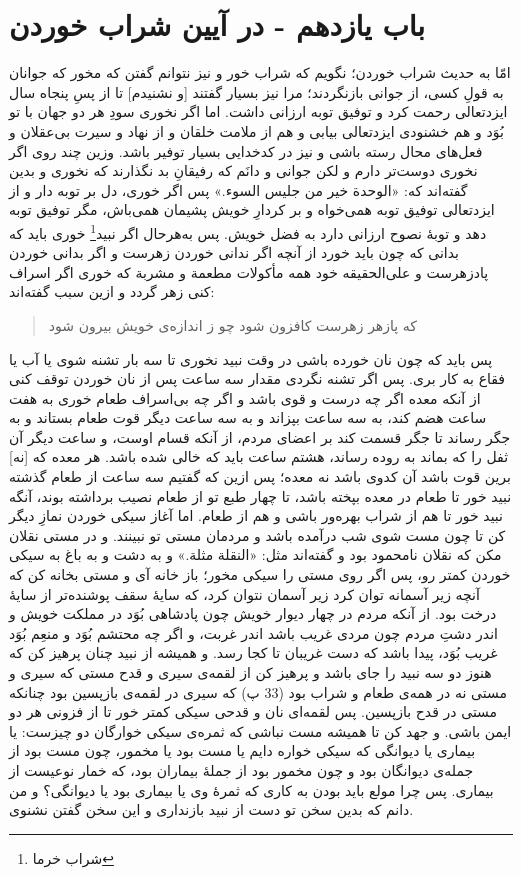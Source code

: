 \section*{باب یازدهم - در آیین شراب خوردن}


امّا به حديث شراب خوردن؛ نگويم كه شراب خور و نيز نتوانم گفتن كه مخور كه جوانان به قولِ كسى، از جوانى بازنگردند؛ مرا نيز بسيار گفتند [و نشنيدم] تا از پسِ پنجاه سال ايزدتعالى رحمت كرد و توفيق توبه ارزانى داشت. اما اگر نخورى سودِ هر دو جهان با تو بُوَد و هم خشنودى ايزدتعالى بيابى و هم از ملامت خلقان و از نهاد و سيرت بى‌عقلان و فعل‌هاى محال رسته باشى و نيز در كدخدايى بسيار توفير باشد. وزين چند روى اگر نخورى دوست‌تر دارم و لكن جوانى و دانَم كه رفيقانِ بد نگذارند كه نخورى و بدين گفته‌اند كه: «الوحدة خير من جليس السوء.» پس اگر خورى، دل بر توبه دار و از ايزدتعالى توفيق توبه همى‌خواه و بر كردارِ خويش پشيمان همى‌باش،  مگر توفيق توبه دهد و توبۀ نصوح ارزانى دارد به فضل خويش. پس به‌هرحال اگر نبيد\footnote{شراب خرما} خورى بايد كه بدانى كه چون بايد خورد از آنچه اگر ندانى خوردن زهرست و اگر بدانى خوردن پادزهرست و على‌الحقيقه خود همه مأكولات مطعمة و مشربة كه خورى اگر اسراف كنى زهر گردد و ازين سبب گفته‌اند:

\begin{quote}
كه پازهر زهرست كافزون شود \quad \quad 
چو ز اندازه‌ی خويش بيرون شود
\end{quote}

پس بايد كه چون نان خورده باشى در وقت نبيد نخورى تا سه بار تشنه شوى يا آب يا فقاع به كار برى. پس اگر تشنه نگردى مقدار سه ساعت پس از نان خوردن توقف كنى از آنكه معده اگر چه درست و قوى باشد و اگر چه بى‌اسراف طعام خورى به هفت ساعت هضم كند، به سه ساعت بپزاند و به سه ساعت ديگر قوت طعام بستاند و به جگر رساند تا جگر قسمت كند بر اعضاى مردم، از آنكه قسام اوست، و ساعت ديگر آن ثفل را كه بماند به روده رساند، هشتم ساعت بايد كه خالى شده باشد. هر معده كه [نه] برين قوت باشد آن كدوى باشد نه معده؛ پس ازين كه گفتيم سه ساعت از طعام گذشته نبيد خور تا طعام در معده بپخته باشد، تا چهار طبع تو از طعام نصيب برداشته بوند، آنگه نبيد خور تا هم از شراب بهره‌ور باشى و هم از طعام. اما آغاز سيكى خوردن نمازِ ديگر كن تا چون مست شوى شب درآمده باشد و مردمان مستى تو نبينند. و در مستى نقلان مكن كه نقلان نامحمود بود و گفته‌اند مثل: «النقلة مثلة.» و به دشت و به باغ به سيكى خوردن كمتر رو، پس اگر روى مستى را سيكى مخور؛ باز خانه آى و مستى بخانه كن كه آنچه زير آسمانه توان كرد زير آسمان نتوان كرد، كه سايۀ سقف پوشنده‌تر از سايۀ درخت بود. از آنكه مردم در چهار ديوار خويش چون پادشاهى بُوَد در مملكت خويش و اندر دشتِ مردم چون مردى غريب باشد اندر غربت، و اگر چه محتشم بُوَد و منعِم بُوَد غريب بُوَد، پيدا باشد كه دست غريبان تا كجا رسد. و هميشه از نبيد چنان پرهيز كن كه هنوز دو سه نبيد را جاى باشد و پرهيز كن از لقمه‌ی سيرى و قدح مستى كه سيرى و مستى نه در همه‌ی طعام و شراب بود (33 پ) كه سيرى در لقمه‌ی بازپسين بود چنانكه مستى در قدح بازپسين. پس لقمه‌اى نان و قدحى سيكى كمتر خور تا از فزونى هر دو ايمن باشى. و جهد كن تا هميشه مست نباشى كه ثمره‌ی سيكى خوارگان دو چيزست: يا بيمارى يا ديوانگى كه سيكى خواره دايم يا مست بود يا مخمور، چون مست بود از جمله‌ی ديوانگان بود و چون مخمور بود از جملۀ بيماران بود، كه خمار نوعيست از بيمارى. پس چرا مولع بايد بودن به كارى كه ثمرۀ وى يا بيمارى بود يا ديوانگى‌؟ و من دانم كه بدين سخن تو دست از نبيد بازندارى و اين سخن گفتن نشنوى.


